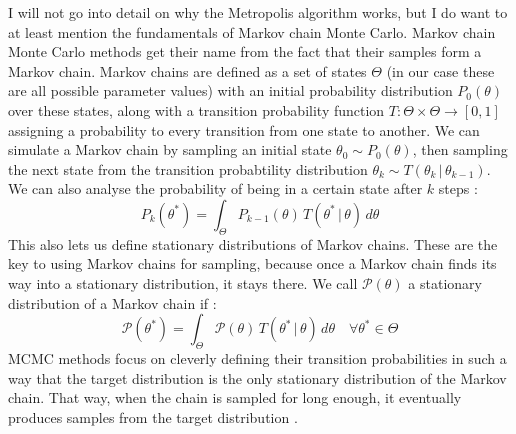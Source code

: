 \documentclass[12pt, a4paper]{report}
\begin{document}
I will not go into detail on why the Metropolis algorithm works, but I do want to at least mention the fundamentals of Markov chain Monte Carlo.
Markov chain Monte Carlo methods get their name from the fact that their samples form a Markov chain.
Markov chains are defined as a set of states $\Theta$ (in our case these are all possible parameter values) with an initial probability distribution $P_0(\theta)$ over these states, along with a transition probability function $T: \Theta \times \Theta \rightarrow [0,1]$ assigning a probability to every transition from one state to another.
We can simulate a Markov chain by sampling an initial state $\theta_0 \sim P_0(\theta)$, then sampling the next state from the transition probabtility distribution $\theta_k \sim T(\theta_k \,|\, \theta_{k-1})$.
We can also analyse the probability of being in a certain state after $k$ steps \cite[372]{mckay}: 
$$
    P_k(\theta^*) = \int_{\Theta} P_{k-1}(\theta) \, T(\theta^* \,|\, \theta) \, d\theta 
$$
This also lets us define stationary distributions of Markov chains.
These are the key to using Markov chains for sampling, because once a Markov chain finds its way into a stationary distribution, it stays there.
We call $\mathcal{P}(\theta)$ a stationary distribution of a Markov chain if \cite[372]{mckay}:
$$
    \mathcal{P}(\theta^*) = \int_{\Theta} \mathcal{P}(\theta) \, T(\theta^* \,|\, \theta) \, d\theta \quad \forall \theta^* \in \Theta
$$
MCMC methods focus on cleverly defining their transition probabilities in such a way that the target distribution is the only stationary distribution of the Markov chain.
That way, when the chain is sampled for long enough, it eventually produces samples from the target distribution \cite[372]{mckay}.
\end{document}
